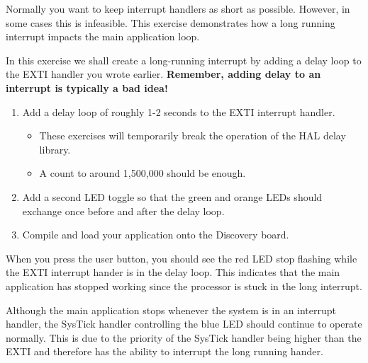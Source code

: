 \documentclass[11pt,fleqn]{book} %
\begin{document}
\begin{exercise}
    \label{ex6}
   Normally you want to keep interrupt handlers as short as possible. However, in some cases this is infeasible. This exercise demonstrates how a long running interrupt impacts the main application loop. 

   In this exercise we shall create a long-running interrupt by adding a delay loop to the EXTI handler you wrote earlier. \textbf{Remember, adding delay to an interrupt is typically a bad idea!} 
   \begin{enumerate}
       \item Add a delay loop of roughly 1-2 seconds to the EXTI interrupt handler.
       \begin{itemize}
           \item These exercises will temporarily break the operation of the HAL delay library.
           \item A count to around 1,500,000 should be enough. 
       \end{itemize} 
       \item Add a second LED toggle so that the green and orange LEDs should exchange once before and after the delay loop. 
       \item Compile and load your application onto the Discovery board.
   \end{enumerate}
   
    \noindent When you press the user button, you should see the red LED stop flashing while the EXTI interrupt hander is in the delay loop. This indicates that the main application has stopped working since the processor is stuck in the long interrupt. 
    
   Although the main application stops whenever the system is in an interrupt handler, the SysTick handler controlling the blue LED should continue to operate normally. This is due to the priority of the SysTick handler being higher than the EXTI and therefore has the ability to interrupt the long running hander. 
\end{exercise}
  
\end{document}
